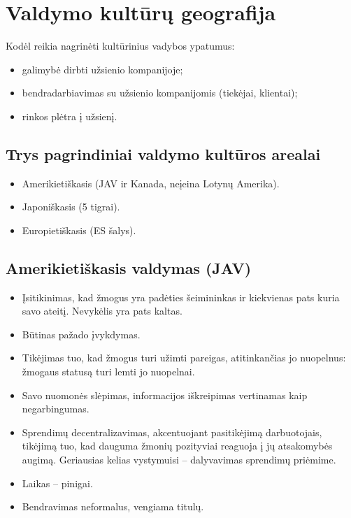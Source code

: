 \chapter{Valdymo kultūrų geografija}

Kodėl reikia nagrinėti kultūrinius vadybos ypatumus:
\begin{itemize}
  \item galimybė dirbti užsienio kompanijoje;
  \item bendradarbiavimas su užsienio kompanijomis (tiekėjai, klientai);
  \item rinkos plėtra į užsienį.
\end{itemize}

\section{Trys pagrindiniai valdymo kultūros arealai}

\begin{itemize}
  \item Amerikietiškasis (JAV ir Kanada, neįeina Lotynų Amerika).
  \item Japoniškasis (5 tigrai).
  \item Europietiškasis (ES šalys).
\end{itemize}

\section{Amerikietiškasis valdymas (JAV)}

\begin{itemize}
  \item Įsitikinimas, kad žmogus yra padėties šeimininkas ir kiekvienas
    pats kuria savo ateitį. Nevykėlis yra pats kaltas.
  \item Būtinas pažado įvykdymas.
  \item Tikėjimas tuo, kad žmogus turi užimti pareigas, atitinkančias
    jo nuopelnus: žmogaus statusą turi lemti jo nuopelnai.
  \item Savo nuomonės slėpimas, informacijos iškreipimas vertinamas
    kaip negarbingumas.
  \item Sprendimų decentralizavimas, akcentuojant pasitikėjimą
    darbuotojais, tikėjimą tuo, kad dauguma žmonių pozityviai reaguoja
    į jų atsakomybės augimą. Geriausias kelias vystymuisi – dalyvavimas
    sprendimų priėmime.
  \item Laikas – pinigai.
  \item Bendravimas neformalus, vengiama titulų.
\end{itemize}

